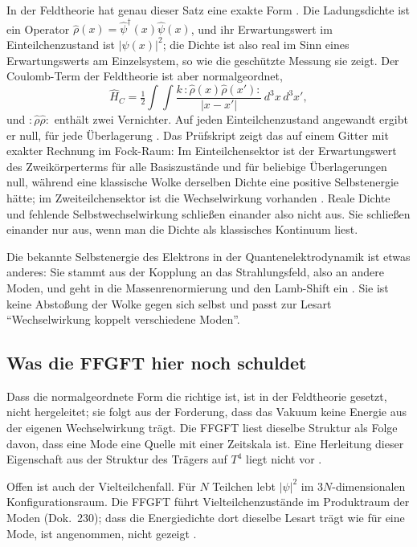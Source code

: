 In der Feldtheorie hat genau dieser Satz eine exakte Form \EM. Die Ladungsdichte ist ein Operator
$\hat\rho(x)=\hat\psi^\dagger(x)\hat\psi(x)$, und ihr Erwartungswert im Einteilchenzustand ist
$|\psi(x)|^2$; die Dichte ist also real im Sinn eines Erwartungswerts am Einzelsystem, so wie die
geschützte Messung sie zeigt. Der Coulomb-Term der Feldtheorie ist aber normalgeordnet,
\begin{equation}
  \hat H_C=\tfrac12\!\int\!\!\int \frac{k\,{:}\hat\rho(x)\hat\rho(x'){:}}{|x-x'|}\,d^3x\,d^3x' ,
\end{equation}
und ${:}\hat\rho\hat\rho{:}$ enthält zwei Vernichter. Auf jeden Einteilchenzustand angewandt ergibt er
null, für jede Überlagerung \BM. Das Prüfskript zeigt das auf einem Gitter mit exakter Rechnung im
Fock-Raum: Im Einteilchensektor ist der Erwartungswert des Zweikörperterms für alle Basiszustände
und für beliebige Überlagerungen null, während eine klassische Wolke derselben Dichte eine positive
Selbstenergie hätte; im Zweiteilchensektor ist die Wechselwirkung vorhanden \KM. Reale Dichte und
fehlende Selbstwechselwirkung schließen einander also nicht aus. Sie schließen einander nur aus,
wenn man die Dichte als klassisches Kontinuum liest.

Die bekannte Selbstenergie des Elektrons in der Quantenelektrodynamik ist etwas anderes: Sie stammt
aus der Kopplung an das Strahlungsfeld, also an andere Moden, und geht in die Massenrenormierung und
den Lamb-Shift ein \EM. Sie ist keine Abstoßung der Wolke gegen sich selbst und passt zur Lesart
\enquote{Wechselwirkung koppelt verschiedene Moden}.

\subsection{Was die FFGFT hier noch schuldet}

Dass die normalgeordnete Form die richtige ist, ist in der Feldtheorie gesetzt, nicht hergeleitet;
sie folgt aus der Forderung, dass das Vakuum keine Energie aus der eigenen Wechselwirkung trägt. Die
FFGFT liest dieselbe Struktur als Folge davon, dass eine Mode eine Quelle mit einer Zeitskala ist.
Eine Herleitung dieser Eigenschaft aus der Struktur des Trägers auf $T^4$ liegt nicht vor \SM.

Offen ist auch der Vielteilchenfall. Für $N$ Teilchen lebt $|\psi|^2$ im $3N$-dimensionalen
Konfigurationsraum. Die FFGFT führt Vielteilchenzustände im Produktraum der Moden (Dok.~230); dass die
Energiedichte dort dieselbe Lesart trägt wie für eine Mode, ist angenommen, nicht gezeigt \SM.


